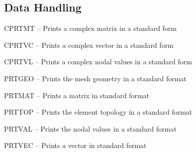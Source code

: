 \subsection*{Data Handling} %
\begin{list}{}{\leftmargin=57pt }
\item[CPRTMT \hfill] -- Prints a complex matrix in a standard form
\item[CPRTVC \hfill] -- Prints a complex vector in a standard form
\item[CPRTVL \hfill] -- Prints a complex nodal values in a standard form
\item[PRTGEO \hfill] -- Prints the mesh geometry in a standard format
\item[PRTMAT \hfill] -- Prints a matrix in standard format
\item[PRTTOP \hfill] -- Prints the element topology in a standard format
\item[PRTVAL \hfill] -- Prints the nodal values in a standard format
\item[PRTVEC \hfill] -- Prints a vector in standard format
\end{list}
